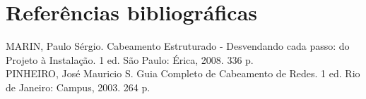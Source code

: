 \documentclass[	DIV=calc,%
							paper=a4,%
							fontsize=12pt,%
							onecolumn]{scrartcl}	 					%
\begin{document}
\section{Referências bibliográficas}
MARIN, Paulo Sérgio. Cabeamento Estruturado - Desvendando cada passo: do Projeto à
Instalação. 1 ed. São Paulo: Érica, 2008. 336 p.
\\

PINHEIRO, José Mauricio S. Guia Completo de Cabeamento de Redes. 1 ed. Rio de Janeiro:
Campus, 2003. 264 p. 







\end{document}

